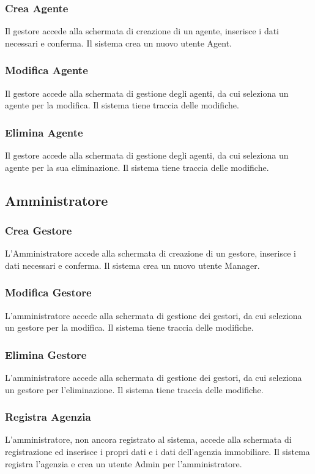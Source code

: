 \subsubsection{Crea Agente}
Il gestore accede alla schermata di creazione di un agente, inserisce i 
dati necessari e conferma. Il sistema crea un nuovo utente Agent.

\subsubsection{Modifica Agente}
Il gestore accede alla schermata di gestione degli agenti, da cui 
seleziona un agente per la modifica. Il sistema tiene traccia delle
modifiche.

\subsubsection{Elimina Agente}
Il gestore accede alla schermata di gestione degli agenti, da cui 
seleziona un agente per la sua eliminazione. Il sistema tiene traccia delle
modifiche.

\subsection{Amministratore}
\subsubsection{Crea Gestore}
L'Amministratore accede alla schermata di creazione di un gestore, 
inserisce i dati necessari e conferma. Il sistema crea un nuovo utente Manager.

\subsubsection{Modifica Gestore}
L'amministratore accede alla schermata di gestione dei gestori, da cui 
seleziona un gestore per la modifica. Il sistema tiene traccia delle
modifiche.

\subsubsection{Elimina Gestore}
L'amministratore accede alla schermata di gestione dei gestori, da cui 
seleziona un gestore per l'eliminazione. Il sistema tiene traccia delle
modifiche.

\subsubsection{Registra Agenzia}
L'amministratore, non ancora registrato al sistema, accede alla schermata di registrazione 
ed inserisce i propri dati e i dati dell'agenzia immobiliare. Il sistema registra l'agenzia 
e crea un utente Admin per l'amministratore.

